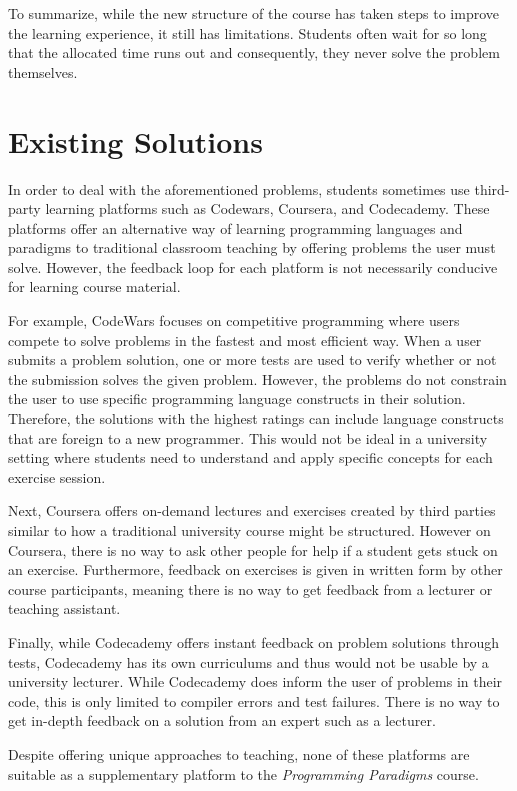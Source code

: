 To summarize, while the new structure of the course has taken steps to improve the learning experience, it still has limitations.
Students often wait for so long that the allocated time runs out and consequently, they never solve the problem themselves.

\section{Existing Solutions}
In order to deal with the aforementioned problems, students sometimes use third-party learning platforms such as Codewars\cite{Codewars}, Coursera\cite{Coursera}, and Codecademy\cite{Codecademy}.
These platforms offer an alternative way of learning programming languages and paradigms to traditional classroom teaching by offering problems the user must solve.
However, the feedback loop for each platform is not necessarily conducive for learning course material.


For example, CodeWars focuses on competitive programming where users compete to solve problems in the fastest and most efficient way.
When a user submits a problem solution, one or more tests are used to verify whether or not the submission solves the given problem.
However, the problems do not constrain the user to use specific programming language constructs in their solution.
Therefore, the solutions with the highest ratings can include language constructs that are foreign to a new programmer.
This would not be ideal in a university setting where students need to understand and apply specific concepts for each exercise session.


Next, Coursera offers on-demand lectures and exercises created by third parties similar to how a traditional university course might be structured.
However on Coursera, there is no way to ask other people for help if a student gets stuck on an exercise.
Furthermore, feedback on exercises is given in written form by other course participants, meaning there is no way to get feedback from a lecturer or teaching assistant.


Finally, while Codecademy offers instant feedback on problem solutions through tests, Codecademy has its own curriculums and thus would not be usable by a university lecturer.
While Codecademy does inform the user of problems in their code, this is only limited to compiler errors and test failures.
There is no way to get in-depth feedback on a solution from an expert such as a lecturer.

Despite offering unique approaches to teaching, none of these platforms are suitable as a supplementary platform to the \textit{Programming Paradigms} course.

